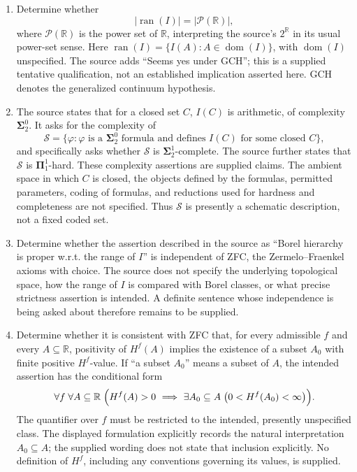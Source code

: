 \documentclass[11pt]{article}
\newcommand{\R}{\mathbb{R}}
\begin{document}
\begin{enumerate}
\item Determine whether
\[
\bigl|\operatorname{ran}(I)\bigr|=\bigl|\mathcal P(\R)\bigr|,
\]
where \(\mathcal P(\R)\) is the power set of \(\R\), interpreting the source's \(2^{\mathbb R}\) in its usual power-set sense. Here \(\operatorname{ran}(I)=\{I(A):A\in\operatorname{dom}(I)\}\), with \(\operatorname{dom}(I)\) unspecified. The source adds ``Seems yes under GCH''; this is a supplied tentative qualification, not an established implication asserted here. GCH denotes the generalized continuum hypothesis.

\item The source states that for a closed set \(C\), \(I(C)\) is arithmetic, of complexity \(\mathbf{\Sigma}^{0}_{2}\). It asks for the complexity of
\[
\mathcal S=\bigl\{\varphi:\varphi\text{ is a }\mathbf{\Sigma}^{0}_{2}\text{ formula and defines }I(C)\text{ for some closed }C\bigr\},
\]
and specifically asks whether \(\mathcal S\) is \(\mathbf{\Sigma}^{1}_{2}\)-complete. The source further states that \(\mathcal S\) is \(\mathbf{\Pi}^{1}_{1}\)-hard. These complexity assertions are supplied claims. The ambient space in which \(C\) is closed, the objects defined by the formulas, permitted parameters, coding of formulas, and reductions used for hardness and completeness are not specified. Thus \(\mathcal S\) is presently a schematic description, not a fixed coded set.

\item Determine whether the assertion described in the source as ``Borel hierarchy is proper w.r.t. the range of \(I\)'' is independent of ZFC, the Zermelo--Fraenkel axioms with choice. The source does not specify the underlying topological space, how the range of \(I\) is compared with Borel classes, or what precise strictness assertion is intended. A definite sentence whose independence is being asked about therefore remains to be supplied.

\item Determine whether it is consistent with ZFC that, for every admissible \(f\) and every \(A\subseteq\R\), positivity of \(H^f(A)\) implies the existence of a subset \(A_0\) with finite positive \(H^f\)-value. If ``a subset \(A_0\)'' means a subset of \(A\), the intended assertion has the conditional form
\[
\forall f\;\forall A\subseteq\R\;\Bigl(H^f(A)>0\ \Longrightarrow\ \exists A_0\subseteq A\;\bigl(0<H^f(A_0)<\infty\bigr)\Bigr).
\]
The quantifier over \(f\) must be restricted to the intended, presently unspecified class. The displayed formulation explicitly records the natural interpretation \(A_0\subseteq A\); the supplied wording does not state that inclusion explicitly. No definition of \(H^f\), including any conventions governing its values, is supplied.
\end{enumerate}
\end{document}
